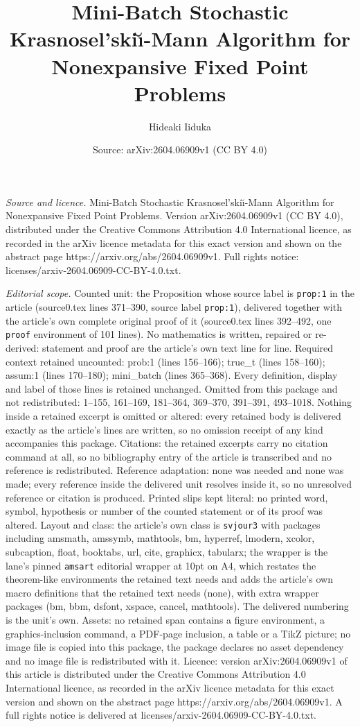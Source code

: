 \documentclass[10pt,a4paper]{amsart}
\title[Mini-Batch Stochastic Krasnosel'ski\u\i-Mann Algorithm for N]{Mini-Batch Stochastic Krasnosel'ski\u\i-Mann Algorithm for Nonexpansive Fixed Point Problems}
\author{Hideaki Iiduka}
\date{Source: arXiv:2604.06909v1 (CC BY 4.0)}
\begin{document}
\maketitle

\noindent\emph{Source and licence.} Mini-Batch Stochastic Krasnosel'ski\u\i-Mann Algorithm for Nonexpansive Fixed Point Problems. Version arXiv:2604.06909v1 (CC BY 4.0), distributed under the Creative Commons Attribution 4.0 International licence, as recorded in the arXiv licence metadata for this exact version and shown on the abstract page https://arxiv.org/abs/2604.06909v1. Full rights notice: licenses/arxiv-2604.06909-CC-BY-4.0.txt.\par\smallskip

\noindent\textit{Editorial scope.} Counted unit: the Proposition whose source label is \texttt{prop:1} in the article (source0.tex lines 371--390, source label \texttt{prop:1}), delivered together with the article's own complete original proof of it (source0.tex lines 392--492, one \texttt{proof} environment of 101 lines). No mathematics is written, repaired or re-derived: statement and proof are the article's own text line for line. Required context retained uncounted: prob:1 (lines 156--166); true\_t (lines 158--160); assum:1 (lines 170--180); mini\_batch (lines 365--368). Every definition, display and label of those lines is retained unchanged. Omitted from this package and not redistributed: 1--155, 161--169, 181--364, 369--370, 391--391, 493--1018. Nothing inside a retained excerpt is omitted or altered: every retained body is delivered exactly as the article's lines are written, so no omission receipt of any kind accompanies this package. Citations: the retained excerpts carry no citation command at all, so no bibliography entry of the article is transcribed and no reference is redistributed. Reference adaptation: none was needed and none was made; every reference inside the delivered unit resolves inside it, so no unresolved reference or citation is produced. Printed slips kept literal: no printed word, symbol, hypothesis or number of the counted statement or of its proof was altered. Layout and class: the article's own class is \texttt{svjour3} with packages including amsmath, amssymb, mathtools, bm, hyperref, lmodern, xcolor, subcaption, float, booktabs, url, cite, graphicx, tabularx; the wrapper is the lane's pinned \texttt{amsart} editorial wrapper at 10pt on A4, which restates the theorem-like environments the retained text needs and adds the article's own macro definitions that the retained text needs (none), with extra wrapper packages (bm, bbm, dsfont, xspace, cancel, mathtools). The delivered numbering is the unit's own. Assets: no retained span contains a figure environment, a graphics-inclusion command, a PDF-page inclusion, a table or a TikZ picture; no image file is copied into this package, the package declares no asset dependency and no image file is redistributed with it. Licence: version arXiv:2604.06909v1 of this article is distributed under the Creative Commons Attribution 4.0 International licence, as recorded in the arXiv licence metadata for this exact version and shown on the abstract page https://arxiv.org/abs/2604.06909v1. A full rights notice is delivered at licenses/arxiv-2604.06909-CC-BY-4.0.txt. 
\end{document}
